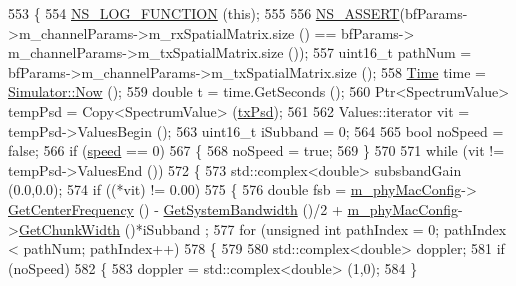 \begin{DoxyCode}
553 \{
554         \hyperlink{log-macros-disabled_8h_a90b90d5bad1f39cb1b64923ea94c0761}{NS\_LOG\_FUNCTION} (\textcolor{keyword}{this});
555 
556         \hyperlink{assert_8h_a6dccdb0de9b252f60088ce281c49d052}{NS\_ASSERT}(bfParams->m\_channelParams->m\_rxSpatialMatrix.size () == bfParams->
      m\_channelParams->m\_txSpatialMatrix.size ());
557         uint16\_t pathNum = bfParams->m\_channelParams->m\_txSpatialMatrix.size ();
558         \hyperlink{namespacens3_1_1TracedValueCallback_a7ffd3e7c142ffe7c8a1d2db9b8de38ec}{Time} time = \hyperlink{classns3_1_1Simulator_ac3178fa975b419f7875e7105be122800}{Simulator::Now} ();
559         \textcolor{keywordtype}{double} t = time.GetSeconds ();
560         Ptr<SpectrumValue> tempPsd = Copy<SpectrumValue> (\hyperlink{lte__link__budget_8m_a684fe3101a5e48a5fcc57cab8dbcd1aa}{txPsd});
561 
562         Values::iterator vit = tempPsd->ValuesBegin ();
563         uint16\_t iSubband = 0;
564 
565         \textcolor{keywordtype}{bool} noSpeed = \textcolor{keyword}{false};
566         \textcolor{keywordflow}{if} (\hyperlink{mmwave-amc-test_8cc_a6dc6e6f3c75c509ce943163afb5dade7}{speed} == 0)
567         \{
568                 noSpeed = \textcolor{keyword}{true};
569         \}
570 
571         \textcolor{keywordflow}{while} (vit != tempPsd->ValuesEnd ())
572         \{
573                 std::complex<double> subsbandGain (0.0,0.0);
574                 \textcolor{keywordflow}{if} ((*vit) != 0.00)
575                 \{
576                         \textcolor{keywordtype}{double} fsb = \hyperlink{classns3_1_1MmWaveChannelMatrix_ad92dc270601be7284b3e8b42654307fa}{m\_phyMacConfig}->
      \hyperlink{classns3_1_1MmWavePhyMacCommon_a0850d2e37c7075b9bce242723b722019}{GetCenterFrequency} () - \hyperlink{classns3_1_1MmWaveChannelMatrix_a6a9cd8af5d1d6281329802644b8a3dd0}{GetSystemBandwidth} ()/2 + 
      \hyperlink{classns3_1_1MmWaveChannelMatrix_ad92dc270601be7284b3e8b42654307fa}{m\_phyMacConfig}->\hyperlink{classns3_1_1MmWavePhyMacCommon_acc801566d527f1893d67a618ea3be203}{GetChunkWidth} ()*iSubband ;
577                         \textcolor{keywordflow}{for} (\textcolor{keywordtype}{unsigned} \textcolor{keywordtype}{int} pathIndex = 0; pathIndex < pathNum; pathIndex++)
578                         \{
579 
580                                 std::complex<double> doppler;
581                                 \textcolor{keywordflow}{if} (noSpeed)
582                                 \{
583                                         doppler = std::complex<double> (1,0);
584                                 \}

\end{DoxyCode}
